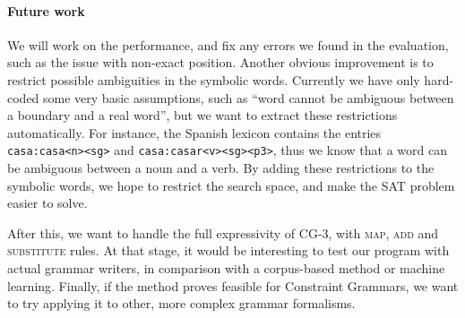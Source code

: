 




\paragraph{Future work} 

We will work on the performance, and fix any errors we found in the
evaluation, such as the issue with non-exact position.
Another obvious improvement is to restrict possible ambiguities
in the symbolic words.
Currently we have only hard-coded some
very basic assumptions, such as ``word cannot be ambiguous between a
boundary and a real word'', but we want to extract these restrictions
automatically.
For instance, the Spanish lexicon contains the entries
\texttt{casa:casa<n><sg>}  and  \texttt{casa:casar<v><sg><p3>}, thus
we know that a word can be ambiguous between a noun and a verb.
By adding these restrictions to the symbolic words, we hope to
restrict the search space, and make the SAT problem easier to solve.

After this, we want to handle the full expressivity of CG-3, with \textsc{map}, \textsc{add} and \textsc{substitute} rules.
At that stage, it would be interesting to test our program with actual grammar writers,
in comparison with a corpus-based method or machine learning.
Finally, if the method proves feasible for Constraint Grammars, we want
to try applying it to other, more complex grammar formalisms.


